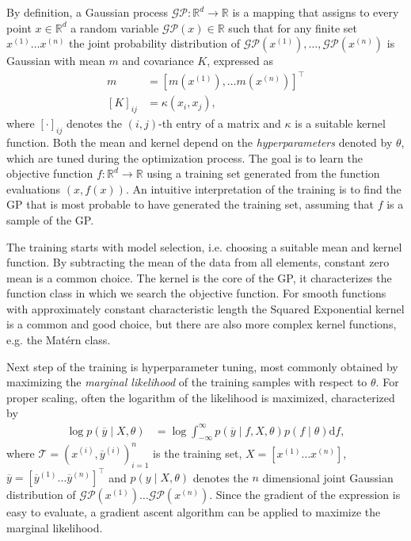 By definition, a Gaussian process $\mathcal{GP}: \mathbb{R}^{d} \rightarrow \mathbb{R}$ is a mapping that assigns to every point $x \in \mathbb{R}^{d}$ a random variable $\mathcal{G} \mathcal{P}(x) \in \mathbb{R}$ such that for any finite set $x^{(1)} \ldots x^{(n)}$ the joint probability distribution of $\mathcal{G} \mathcal{P}\left(x^{(1)}\right), \ldots, \mathcal{G} \mathcal{P}\left(x^{(n)}\right)$ is Gaussian with mean $m$ and covariance $K$, expressed as
\begin{subequations}
\begin{align}
m &=\left[m\left(x^{(1)}\right), \ldots m\left(x^{(n)}\right)\right]^{\top} \\
[K]_{i j} &=\kappa\left(x_{i}, x_{j}\right),
\end{align}
\end{subequations}
where $[\cdot]_{i j}$ denotes the $(i, j)$-th entry of a matrix and $\kappa$ is a suitable kernel function. Both the mean and kernel depend on the \textit{hyperparameters} denoted by $\theta$, which are tuned during the optimization process. The goal is to learn the objective function $f:\mathbb{R}^d \rightarrow \mathbb{R}$ using a training set generated from the function evaluations $(x, f(x))$. An intuitive interpretation of the training is to find the GP that is most probable to have generated the training set, assuming that $f$ is a sample of the GP. 

The training starts with model selection, i.e. choosing a suitable mean and kernel function. By subtracting the mean of the data from all elements, constant zero mean is a common choice. The kernel is the core of the GP, it characterizes the function class in which we search the objective function. For smooth functions with approximately constant characteristic length the Squared Exponential kernel is a common and good choice, but there are also more complex kernel functions, e.g. the Matérn class.

Next step of the training is hyperparameter tuning, most commonly obtained by maximizing the \textit{marginal likelihood} of the training samples with respect to $\theta$. For proper scaling, often the logarithm of the likelihood is maximized, characterized by
\begin{align}
\log p(\overline{y} \mid {X}, {\theta}) &=\log \int_{-\infty}^{\infty} p(\overline{y} \mid f, {X}, {\theta}) p(f \mid {\theta}) \mathrm{d} f,
\end{align}
where $\mathcal{T} = {(x^{(i)},\overline y^{(i)})}_{i=1}^n$ is the training set, $X=[x^{(1)}\dots x^{(n)}]$, $\overline y = [\overline y^{(1)}\dots \overline y^{(n)}]^\top$ and $p({y} \mid {X}, {\theta})$ denotes the $n$ dimensional joint Gaussian distribution of $\mathcal{GP}(x^{(1)})\dots\mathcal{GP}(x^{(n)})$. Since the gradient of the expression is easy to evaluate, a gradient ascent algorithm can be applied to maximize the marginal likelihood.

